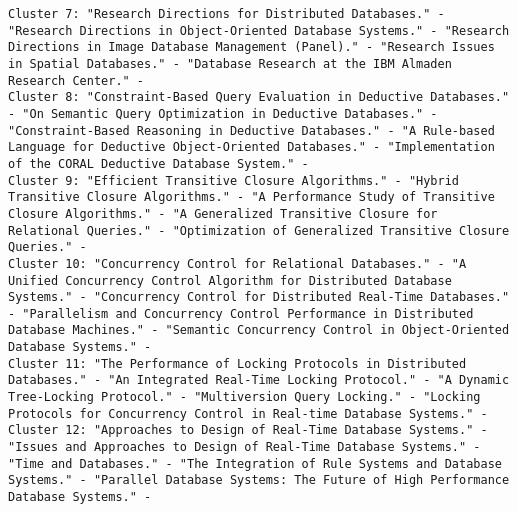 \documentclass[11pt]{article}
\begin{document}
\begin{verbatim}
Cluster 7: "Research Directions for Distributed Databases." - "Research Directions in Object-Oriented Database Systems." - "Research Directions in Image Database Management (Panel)." - "Research Issues in Spatial Databases." - "Database Research at the IBM Almaden Research Center." - 
Cluster 8: "Constraint-Based Query Evaluation in Deductive Databases." - "On Semantic Query Optimization in Deductive Databases." - "Constraint-Based Reasoning in Deductive Databases." - "A Rule-based Language for Deductive Object-Oriented Databases." - "Implementation of the CORAL Deductive Database System." - 
Cluster 9: "Efficient Transitive Closure Algorithms." - "Hybrid Transitive Closure Algorithms." - "A Performance Study of Transitive Closure Algorithms." - "A Generalized Transitive Closure for Relational Queries." - "Optimization of Generalized Transitive Closure Queries." - 
Cluster 10: "Concurrency Control for Relational Databases." - "A Unified Concurrency Control Algorithm for Distributed Database Systems." - "Concurrency Control for Distributed Real-Time Databases." - "Parallelism and Concurrency Control Performance in Distributed Database Machines." - "Semantic Concurrency Control in Object-Oriented Database Systems." - 
Cluster 11: "The Performance of Locking Protocols in Distributed Databases." - "An Integrated Real-Time Locking Protocol." - "A Dynamic Tree-Locking Protocol." - "Multiversion Query Locking." - "Locking Protocols for Concurrency Control in Real-time Database Systems." - 
Cluster 12: "Approaches to Design of Real-Time Database Systems." - "Issues and Approaches to Design of Real-Time Database Systems." - "Time and Databases." - "The Integration of Rule Systems and Database Systems." - "Parallel Database Systems: The Future of High Performance Database Systems." - 



\end{verbatim}
\end{document}
